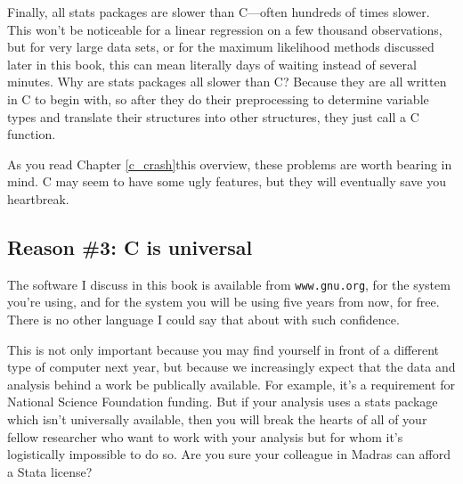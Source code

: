 Finally, all stats packages are slower than C---often hundreds of times
slower. This won't be noticeable for a linear regression on a few thousand
observations, but for very large data sets, or for the maximum likelihood
methods discussed later in this book, this can mean literally days of
waiting instead of several minutes.  Why are stats packages all slower
than C? Because they are all written in C to begin with, so after they
do their preprocessing to determine variable types and translate their
structures into other structures, they just call a C function.

As you read \ifbook Chapter \ref{c_crash}\else this overview\fi, these
problems are worth bearing in mind. C may seem to have some ugly
features, but they will eventually save you heartbreak.

\subsection{Reason \#3: C is universal} 
The software I discuss in this book is available from {\tt www.gnu.org}, for the
system you're using, and for the system you will be using five years from now, for
free. There is no other language I could say that about with such confidence.

This is not only important because you may find yourself in front of
a different type of computer next year, but because we increasingly
expect that the data and analysis behind a work be publically available.
For example, it's a requirement for National Science Foundation funding. But if your analysis uses
a stats package which isn't universally available, then you will break
the hearts of all of your fellow researcher who want to work with your analysis
but for whom it's logistically impossible to do so. Are you sure your
colleague in Madras can afford a Stata license?

